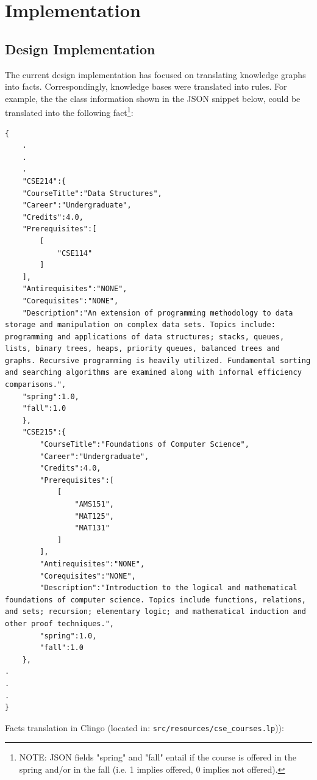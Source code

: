 \documentclass[12pt]{article}
\begin{document}
    \section{Implementation}
    \label{sec:implement}

    \subsection{Design Implementation}
    \label{subsec:des-imp}

    The current design implementation has focused on translating knowledge graphs into facts. Correspondingly, knowledge bases were translated into rules. For example, the the class information shown in the JSON snippet below,  could be translated into the following fact\footnote{NOTE: JSON fields "spring" and "fall" entail if the course is offered in the spring and/or in the fall (i.e. 1 implies offered, 0 implies not offered).}:

    \begin{lstlisting}
{
    .
    .
    .
    "CSE214":{
    "CourseTitle":"Data Structures",
    "Career":"Undergraduate",
    "Credits":4.0,
    "Prerequisites":[
        [
            "CSE114"
        ]
    ],
    "Antirequisites":"NONE",
    "Corequisites":"NONE",
    "Description":"An extension of programming methodology to data storage and manipulation on complex data sets. Topics include: programming and applications of data structures; stacks, queues, lists, binary trees, heaps, priority queues, balanced trees and graphs. Recursive programming is heavily utilized. Fundamental sorting and searching algorithms are examined along with informal efficiency comparisons.",
    "spring":1.0,
    "fall":1.0
    },
    "CSE215":{
        "CourseTitle":"Foundations of Computer Science",
        "Career":"Undergraduate",
        "Credits":4.0,
        "Prerequisites":[
            [
                "AMS151",
                "MAT125",
                "MAT131"
            ]
        ],
        "Antirequisites":"NONE",
        "Corequisites":"NONE",
        "Description":"Introduction to the logical and mathematical foundations of computer science. Topics include functions, relations, and sets; recursion; elementary logic; and mathematical induction and other proof techniques.",
        "spring":1.0,
        "fall":1.0
    },
.
.
.
}
    \end{lstlisting}

    Facts translation in Clingo (located in: {\tt{src/resources/cse\_courses.lp}})): \\
    
\end{document}
